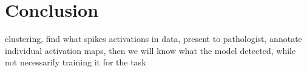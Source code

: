 \chapter*{Conclusion}

clustering, find what spikes activations in data, present to pathologist, annotate individual activation maps, then we will know what the model detected, while not necessarily training it for the task

